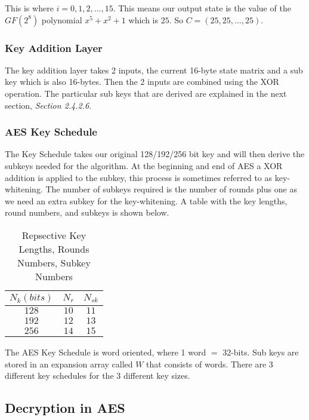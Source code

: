 This is where $i = 0,1,2,...,15$. This means our output state is the value of the $GF(2^8)$ polynomial $x^5 + x^2 + 1$ which is $25$. So $C = (25,25,...,25)$. 
 
\subsubsection{Key Addition Layer}

The key addition layer takes 2 inputs, the current 16-byte state matrix and a sub key which is also 16-bytes. Then the 2 inputs are combined using the XOR operation. The particular sub keys that are derived are explained in the next section, \textit{Section 2.4.2.6}.

\subsubsection{AES Key Schedule}

The Key Schedule takes our original 128/192/256 bit key and will then derive the subkeys needed for the algorithm. At the beginning and end of AES a XOR addition is applied to the subkey, this process is sometimes referred to as key-whitening. The number of subkeys required is the number of rounds plus one as we need an extra subkey for the key-whitening. A table with the key lengths, round numbers, and subkeys is shown below.

\begin{table}[h!]
\begin{center}
\begin{tabular}{ c|c|c } 
$N_k (bits)$ & $N_r$ & $N_{sk}$ \\
\hline
$128$ & $10$ & $11$ \\
$192$ & $12$ & $13$ \\
$256$ & $14$ & $15$ \\
\end{tabular}
\caption{Repsective Key Lengths, Rounds Numbers, Subkey Numbers}
\label{AES-KeyL-RoundNumber-Subkeys}
\end{center}
\end{table}

The AES Key Schedule is word oriented, where 1 word $=$ 32-bits. Sub keys are stored in an expansion array called $W$ that consists of words. There are 3 different key schedules for the 3 different key sizes.

\subsection{Decryption in AES}

